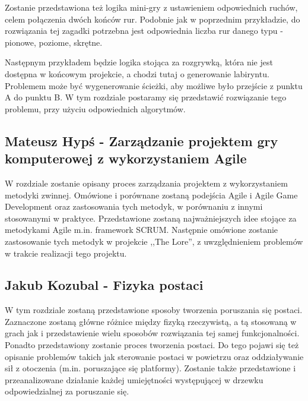 \documentclass[oneside,polski,logo]{amuthesis}
\begin{document}
Zostanie przedstawiona też logika mini-gry z ustawieniem odpowiednich ruchów, celem połączenia dwóch końców rur. Podobnie jak w poprzednim przykładzie, do rozwiązania tej zagadki potrzebna jest odpowiednia liczba rur danego typu - pionowe, poziome, skrętne. 

Następnym przykładem będzie logika stojąca za rozgrywką, która nie jest dostępna w końcowym projekcie, a chodzi tutaj o generowanie labiryntu. Problemem może być wygenerowanie ścieżki, aby możliwe było przejście z punktu A do punktu B. W tym rozdziale postaramy się przedstawić rozwiązanie tego problemu, przy użyciu odpowiednich algorytmów.

\subsection{Mateusz Hypś - Zarządzanie projektem gry komputerowej z wykorzystaniem Agile}
W rozdziale zostanie opisany proces zarządzania projektem z wykorzystaniem metodyki zwinnej. Omówione i porównane zostaną podejścia Agile i Agile Game Development oraz zastosowania tych metodyk, w porównaniu z innymi stosowanymi w praktyce. Przedstawione zostaną najważniejszych idee stojące za metodykami Agile m.in. framework SCRUM. Następnie omówione zostanie zastosowanie tych metodyk w projekcie ,,The Lore”, z uwzględnieniem problemów w trakcie realizacji tego projektu. 

\subsection{Jakub Kozubal - Fizyka postaci}
W tym rozdziale zostaną przedstawione sposoby tworzenia poruszania się postaci. Zaznaczone zostaną główne różnice między fizyką rzeczywistą, a tą stosowaną w grach jak i przedstawienie wielu sposobów rozwiązania tej samej funkcjonalności. Ponadto przedstawiony zostanie proces tworzenia postaci. Do tego pojawi się też opisanie problemów takich jak sterowanie postaci w powietrzu oraz oddziaływanie sił z otoczenia (m.in. poruszające się platformy). Zostanie także przedstawione i przeanalizowane działanie każdej umiejętności występującej w drzewku odpowiedzialnej za poruszanie się.
\end{document}
